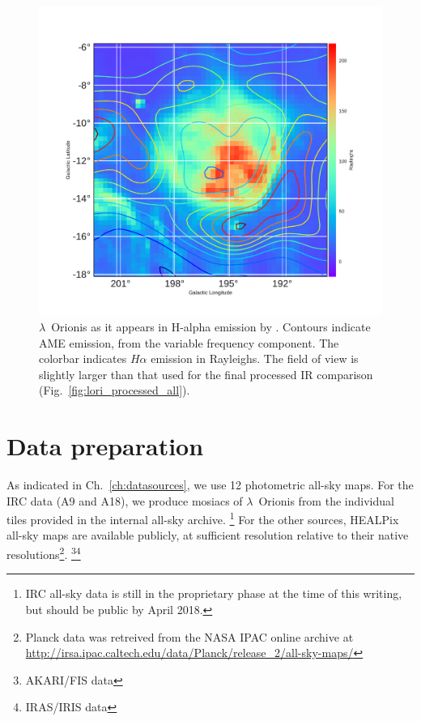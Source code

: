      \begin{figure}
       \includegraphics[width=\textwidth]{../Plots/ch_lori/LOri_halpha_AMEvarContours.pdf}
       \centering
       \caption{$\lambda$~Orionis as it appears in H-alpha emission by \cite{finkbeiner03}. Contours indicate AME emission, from the variable frequency component. The colorbar indicates $H\alpha$ emission in Rayleighs. The field of view is slightly larger than that used for the final processed IR comparison (Fig.~\ref{fig:lori_processed_all}). }
       \label{fig:LOri_halpha_AMEvarContours}
     \end{figure}

	\section{Data preparation}
    \label{sec:dataprocessing}
		As indicated in Ch.~\ref{ch:datasources}, we use 12 photometric all-sky maps. For the IRC data (A9 and A18), we produce mosiacs of $\lambda$~Orionis from the individual tiles provided in the internal all-sky archive.
      \footnote{IRC all-sky data is still in the proprietary phase at the time of this writing, but should be public by April 2018.}
       For the other sources, HEALPix all-sky maps are available publicly, at sufficient resolution relative to their native resolutions\footnote{Planck data was retreived from the NASA IPAC online archive at \url{http://irsa.ipac.caltech.edu/data/Planck/release_2/all-sky-maps/}}. \footnote{AKARI/FIS data }\footnote{IRAS/IRIS data }

